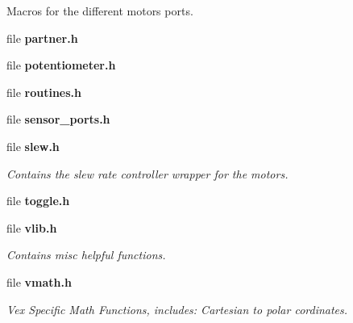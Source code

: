 \begin{DoxyCompactItemize}
\begin{DoxyCompactList}
Macros for the different motors ports. \end{DoxyCompactList}\item 
file \textbf{ partner.\+h}
\item 
file \textbf{ potentiometer.\+h}
\item 
file \textbf{ routines.\+h}
\item 
file \textbf{ sensor\+\_\+ports.\+h}
\item 
file \textbf{ slew.\+h}
\begin{DoxyCompactList}\small\item\em Contains the slew rate controller wrapper for the motors. \end{DoxyCompactList}\item 
file \textbf{ toggle.\+h}
\item 
file \textbf{ vlib.\+h}
\begin{DoxyCompactList}\small\item\em Contains misc helpful functions. \end{DoxyCompactList}\item 
file \textbf{ vmath.\+h}
\begin{DoxyCompactList}\small\item\em Vex Specific Math Functions, includes\+: Cartesian to polar cordinates. \end{DoxyCompactList}\end{DoxyCompactItemize}
